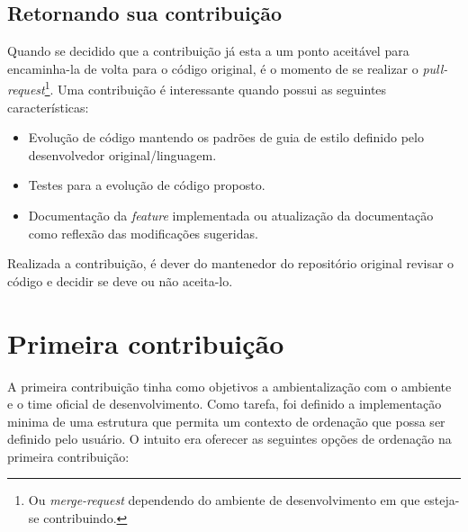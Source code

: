 \subsection*{Retornando sua contribuição} %
\label{sub:retornando_sua_contribui_o}

Quando se decidido que a contribuição já esta a um ponto aceitável para encaminha-la de volta para o código original, é o momento de se realizar o \textit{pull-request}\footnote{Ou \textit{merge-request} dependendo do ambiente de desenvolvimento em que esteja-se contribuindo.}. Uma contribuição é interessante quando possui as seguintes características:


\begin{itemize}
	\item Evolução de código mantendo os padrões de guia de estilo definido pelo desenvolvedor original/linguagem.
	\item Testes para a evolução de código proposto.
	\item Documentação da \textit{feature} implementada ou atualização da documentação como reflexão das modificações sugeridas.
\end{itemize}

Realizada a contribuição, é dever do mantenedor do repositório original revisar o código e decidir se deve ou não aceita-lo.



\section{Primeira contribuição} %
\label{sec:primeira_contribui_o}

A primeira contribuição tinha como objetivos a ambientalização com o ambiente e o time oficial de desenvolvimento. Como tarefa, foi definido a implementação minima de uma estrutura que permita um contexto de ordenação que possa ser definido pelo usuário. O intuito era oferecer as seguintes opções de ordenação na primeira contribuição:

